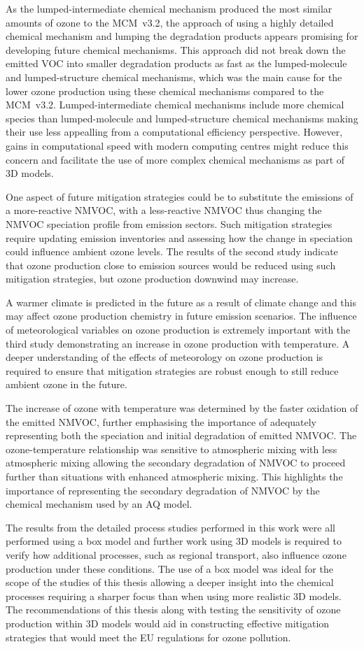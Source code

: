 As the lumped-intermediate chemical mechanism produced the most similar amounts of ozone to the MCM~v3.2, the approach of using a highly detailed chemical mechanism and lumping the degradation products appears promising for developing future chemical mechanisms.
This approach did not break down the emitted VOC into smaller degradation products as fast as the lumped-molecule and lumped-structure chemical mechanisms, which was the main cause for the lower ozone production using these chemical mechanisms compared to the MCM~v3.2.
Lumped-intermediate chemical mechanisms include more chemical species than lumped-molecule and lumped-structure chemical mechanisms making their use less appealling from a computational efficiency perspective.
However, gains in computational speed with modern computing centres might reduce this concern and facilitate the use of more complex chemical mechanisms as part of 3D models.

One aspect of future mitigation strategies could be to substitute the emissions of a more-reactive NMVOC, with a less-reactive NMVOC thus changing the NMVOC speciation profile from emission sectors.
Such mitigation strategies require updating emission inventories and assessing how the change in speciation could influence ambient ozone levels.
The results of the second study indicate that ozone production close to emission sources would be reduced using such mitigation strategies, but ozone production downwind may increase.

A warmer climate is predicted in the future as a result of climate change and this may affect ozone production chemistry in future emission scenarios.
The influence of meteorological variables on ozone production is extremely important with the third study demonstrating an increase in ozone production with temperature.
A deeper understanding of the effects of meteorology on ozone production is required to ensure that mitigation strategies are robust enough to still reduce ambient ozone in the future.

The increase of ozone with temperature was determined by the faster oxidation of the emitted NMVOC, further emphasising the importance of adequately representing both the speciation and initial degradation of emitted NMVOC.
The ozone-temperature relationship was sensitive to atmospheric mixing with less atmospheric mixing allowing the secondary degradation of NMVOC to proceed further than situations with enhanced atmospheric mixing.
This highlights the importance of representing the secondary degradation of NMVOC by the chemical mechanism used by an AQ model.

The results from the detailed process studies performed in this work were all performed using a box model and further work using 3D models is required to verify how additional processes, such as regional transport, also influence ozone production under these conditions.
The use of a box model was ideal for the scope of the studies of this thesis allowing a deeper insight into the chemical processes requiring a sharper focus than when using more realistic 3D models.
The recommendations of this thesis along with testing the sensitivity of ozone production within 3D models would aid in constructing effective mitigation strategies that would meet the EU regulations for ozone pollution.
